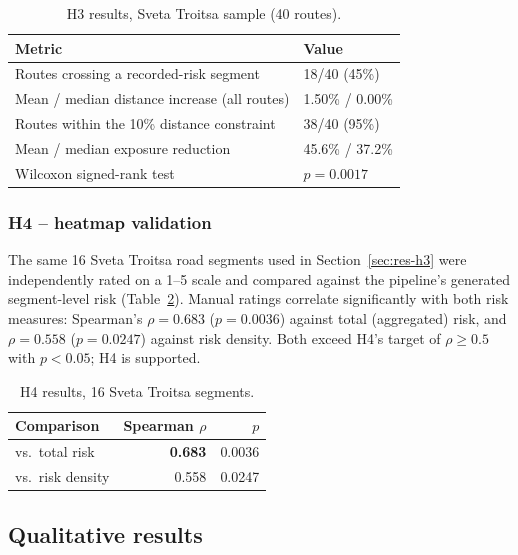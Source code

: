 \documentclass[10pt,a4paper,twocolumn]{article}
\begin{document}
\begin{table}[t]
  \centering
  \small
  \caption{H3 results, Sveta Troitsa sample (40 routes).}
  \label{tab:h3-results}
  \begin{tabular}{@{}p{4.0cm}p{1.6cm}@{}}
    \toprule
    Metric & Value \\
    \midrule
    Routes crossing a recorded-risk segment & 18/40 (45\%) \\
    Mean / median distance increase (all routes) & 1.50\% / 0.00\% \\
    Routes within the 10\% distance constraint & 38/40 (95\%) \\
    Mean / median exposure reduction & 45.6\% / 37.2\% \\
    Wilcoxon signed-rank test & $p{=}0.0017$ \\
    \bottomrule
  \end{tabular}
\end{table}

\subsubsection{H4 -- heatmap validation}
\label{sec:res-h4}

The same 16 Sveta Troitsa road segments used in Section~\ref{sec:res-h3}
were independently rated on a 1--5 scale and compared against the
pipeline's generated segment-level risk (Table~\ref{tab:h4-results}).
Manual ratings correlate significantly with both risk measures: Spearman's
$\rho = 0.683$ ($p = 0.0036$) against total (aggregated) risk, and
$\rho = 0.558$ ($p = 0.0247$) against risk density. Both exceed H4's
target of $\rho \geq 0.5$ with $p < 0.05$; H4 is supported.

\begin{table}[t]
  \centering
  \small
  \caption{H4 results, 16 Sveta Troitsa segments.}
  \label{tab:h4-results}
  \begin{tabular}{@{}p{3.1cm}rr@{}}
    \toprule
    Comparison & Spearman $\rho$ & $p$ \\
    \midrule
    vs.\ total risk & \textbf{0.683} & 0.0036 \\
    vs.\ risk density & 0.558 & 0.0247 \\
    \bottomrule
  \end{tabular}
\end{table}



\subsection{Qualitative results}
\label{sec:res-qualitative}
\end{document}
